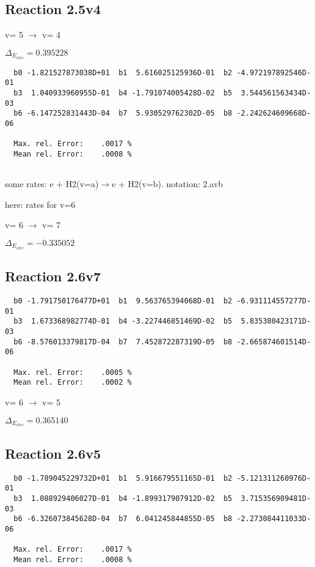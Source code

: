 \documentclass[12pt]{article}
\begin{document}
\subsection{
Reaction 2.5v4
}

  v=  5 $\rightarrow$ v= 4

$\Delta_{E_{elec}}= 0.395228$


\begin{small}\begin{verbatim}
  b0 -1.821527873038D+01  b1  5.616025125936D-01  b2 -4.972197892546D-01
  b3  1.040933960955D-01  b4 -1.791074005428D-02  b5  3.544561563434D-03
  b6 -6.147252831443D-04  b7  5.930529762302D-05  b8 -2.242624609668D-06

  Max. rel. Error:    .0017 %
  Mean rel. Error:    .0008 %


\end{verbatim}\end{small}
\newpage
some rates: e + H2(v=a)$\rightarrow$e + H2(v=b). notation: 2.avb

here: rates for v=6

  v=  6 $\rightarrow$ v= 7

$\Delta_{E_{elec}}=-0.335052$


\subsection{
Reaction 2.6v7
}

\begin{small}\begin{verbatim}
  b0 -1.791750176477D+01  b1  9.563765394068D-01  b2 -6.931114557277D-01
  b3  1.673368982774D-01  b4 -3.227446851469D-02  b5  5.835380423171D-03
  b6 -8.576013379817D-04  b7  7.452872287319D-05  b8 -2.665874601514D-06

  Max. rel. Error:    .0005 %
  Mean rel. Error:    .0002 %

\end{verbatim}\end{small}

  v=  6 $\rightarrow$ v= 5

$\Delta_{E_{elec}}= 0.365140$


\subsection{
Reaction 2.6v5
}


\begin{small}\begin{verbatim}
  b0 -1.789045229732D+01  b1  5.916679551165D-01  b2 -5.121311260976D-01
  b3  1.088929406027D-01  b4 -1.899317907912D-02  b5  3.715356909481D-03
  b6 -6.326073845628D-04  b7  6.041245844855D-05  b8 -2.273084411033D-06

  Max. rel. Error:    .0017 %
  Mean rel. Error:    .0008 %

\end{verbatim}\end{small}
\end{document}
